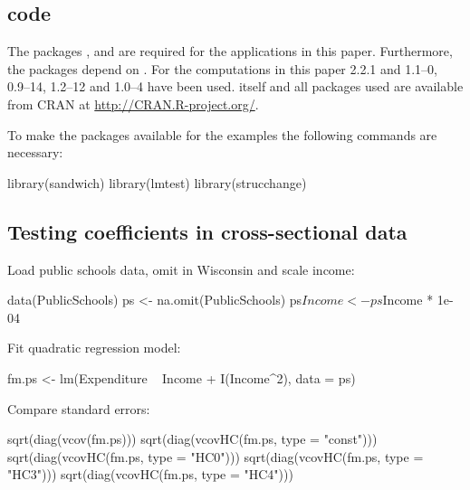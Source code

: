 \documentclass{Z}
\begin{document}
\begin{appendix}


\section[R code]{ code}

The packages ,  and  are
required for the applications in this paper. Furthermore, the packages
depend on . For the computations in this paper 
2.2.1 and 
1.1--0,
 0.9--14,
 1.2--12
and  1.0--4
have been used.  itself and all packages used are available from
CRAN at \url{http://CRAN.R-project.org/}.

To make the packages available for the examples the following commands are 
necessary:
\begin{Schunk}
\begin{Sinput}
  library(sandwich)
  library(lmtest)
  library(strucchange)
\end{Sinput}
\end{Schunk}

\subsection{Testing coefficients in cross-sectional data}

Load public schools data,
omit  in Wisconsin and scale income:
\begin{Schunk}
\begin{Sinput}
  data(PublicSchools)
  ps <- na.omit(PublicSchools)
  ps$Income <- ps$Income * 1e-04
\end{Sinput}
\end{Schunk}

Fit quadratic regression model:
\begin{Schunk}
\begin{Sinput}
  fm.ps <- lm(Expenditure ~ Income + I(Income^2), data = ps)
\end{Sinput}
\end{Schunk}

Compare standard errors:
\begin{Schunk}
\begin{Sinput}
  sqrt(diag(vcov(fm.ps)))
  sqrt(diag(vcovHC(fm.ps, type = "const")))
  sqrt(diag(vcovHC(fm.ps, type = "HC0")))
  sqrt(diag(vcovHC(fm.ps, type = "HC3")))
  sqrt(diag(vcovHC(fm.ps, type = "HC4")))
\end{Sinput}
\end{Schunk}


\end{appendix}
\end{document}
